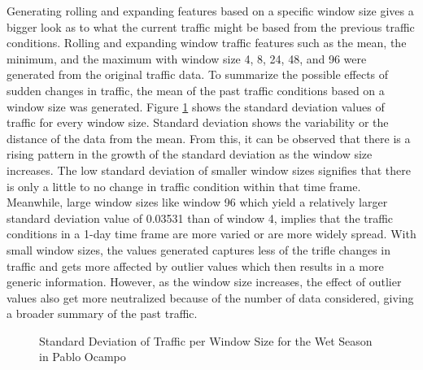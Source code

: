 Generating rolling and expanding features based on a specific window size gives a bigger look as to what the current traffic might be based from the previous traffic conditions. Rolling and expanding window traffic features such as the mean, the minimum, and the maximum with window size  4, 8, 24, 48, and 96 were generated from the original traffic data. To summarize the possible effects of sudden changes in traffic, the mean of the past traffic conditions based on a window size was generated. Figure \ref{stDev} shows the standard deviation values of traffic for every window size. Standard deviation shows the variability or the distance of the data from the mean. From this, it can be observed that there is a rising pattern in the growth of the standard deviation as the window size increases. The low standard deviation of smaller window sizes signifies that there is only a little to no change in traffic condition within that time frame. Meanwhile, large window sizes like window 96 which yield a relatively larger standard deviation value of 0.03531 than of window 4, implies that the traffic conditions in a 1-day time frame are more varied or are more widely spread. With small window sizes, the values generated captures less of the trifle changes in traffic and gets more affected by outlier values which then results in a more generic information. However, as the window size increases, the effect of outlier values also get more neutralized because of the number of data considered, giving a broader summary of the past traffic. 

\begin{figure}[h] 
\centering
  \centering
  \caption{Standard Deviation of Traffic per Window Size for the Wet Season in Pablo Ocampo}
  \label{stDev}
\end{figure}

